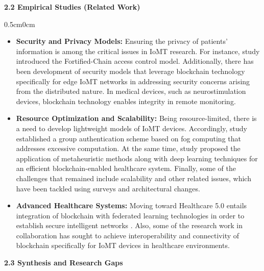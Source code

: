 \documentclass[12pt, a4paper]{report}
\begin{document}
\vspace{0.5cm}
{\color{myblue} \Large \bfseries 2.2  Empirical Studies (Related Work)}
\begin{adjustwidth} {0.5cm}{0cm}
    \vspace{0.1cm}
\begin{itemize}[nosep, topsep=0pt, partopsep=0pt]
    \item \textbf{Security and Privacy Models:} Ensuring the privacy of patients' information is among the critical issues in IoMT research. For instance, study \cite{ref1} introduced the Fortified-Chain access control model. Additionally, there has been development of security models that leverage blockchain technology specifically for edge IoMT networks in addressing security concerns arising from the distributed nature. In medical devices, such as neurostimulation devices, blockchain technology enables integrity in remote monitoring.
    \item \textbf{Resource Optimization and Scalability:} Being resource-limited, there is a need to develop lightweight models of IoMT devices. Accordingly, study \cite{ref2} established a group authentication scheme based on fog computing that addresses excessive computation. At the same time, study \cite{ref3} proposed the application of metaheuristic methods along with deep learning techniques for an efficient blockchain-enabled healthcare system. Finally, some of the challenges that remained include scalability and other related issues, which have been tackled using surveys and architectural changes.
    \item \textbf{Advanced Healthcare Systems:} Moving toward Healthcare 5.0 entails integration of blockchain with federated learning technologies in order to establish secure intelligent networks \cite{ref4}. Also, some of the research work in collaboration has sought to achieve interoperability and connectivity of blockchain specifically for IoMT devices in healthcare environments.

\end{itemize}
\end{adjustwidth}

\vspace{0.5cm}
{\color{myblue} \Large \bfseries 2.3	Synthesis and Research Gaps}
\end{document}
